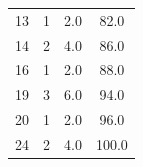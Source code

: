 \documentclass{article}
\begin{document}
\begin{longtable}{|c|c|c|c|}
    13              & 1                  & 2.0                 & 82.0                           \\
    14              & 2                  & 4.0                 & 86.0                           \\
    16              & 1                  & 2.0                 & 88.0                           \\
    19              & 3                  & 6.0                 & 94.0                           \\
    20              & 1                  & 2.0                 & 96.0                           \\
    24              & 2                  & 4.0                 & 100.0                          \\
\end{longtable}
\restoregeometry

\end{document}
